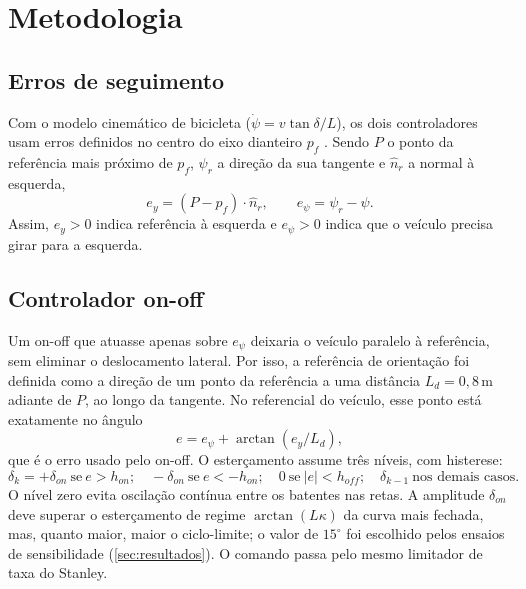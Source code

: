 \section{Metodologia}\label{sec:metodologia}

\subsection{Erros de seguimento}

Com o modelo cinemático de bicicleta ($\dot\psi = v\tan\delta/L$), os dois controladores usam erros definidos no centro do eixo dianteiro $p_f$ \cite{hoffmann2007stanley}. Sendo $P$ o ponto da referência mais próximo de $p_f$, $\psi_r$ a direção da sua tangente e $\hat n_r$ a normal à esquerda,
\begin{equation}
e_y = (P - p_f)\cdot \hat n_r, \qquad e_\psi = \psi_r - \psi .
\end{equation}
Assim, $e_y>0$ indica referência à esquerda e $e_\psi>0$ indica que o veículo precisa girar para a esquerda.

\subsection{Controlador on-off}

Um on-off que atuasse apenas sobre $e_\psi$ deixaria o veículo paralelo à referência, sem eliminar o deslocamento lateral. Por isso, a referência de orientação foi definida como a direção de um ponto da referência a uma distância $L_d=0{,}8\,\mathrm{m}$ adiante de $P$, ao longo da tangente. No referencial do veículo, esse ponto está exatamente no ângulo
\begin{equation}
e = e_\psi + \arctan\left(e_y/L_d\right),
\label{eq:erro-onoff}
\end{equation}
que é o erro usado pelo on-off. O esterçamento assume três níveis, com histerese:
\begin{equation}
\delta_k = +\delta_{on}\ \text{se}\ e>h_{on};\quad -\delta_{on}\ \text{se}\ e<-h_{on};\quad 0\ \text{se}\ |e|<h_{off};\quad \delta_{k-1}\ \text{nos demais casos}.
\end{equation}
O nível zero evita oscilação contínua entre os batentes nas retas. A amplitude $\delta_{on}$ deve superar o esterçamento de regime $\arctan(L\kappa)$ da curva mais fechada, mas, quanto maior, maior o ciclo-limite; o valor de $15^\circ$ foi escolhido pelos ensaios de sensibilidade (\autoref{sec:resultados}). O comando passa pelo mesmo limitador de taxa do Stanley.

